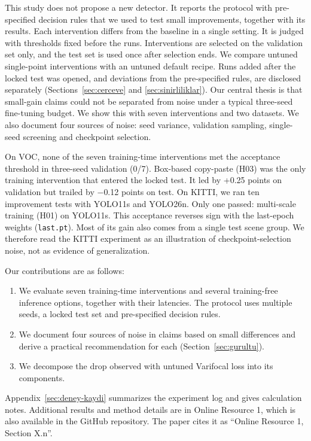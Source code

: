 \documentclass[pdflatex,iicol,sn-mathphys-num]{sn-jnl}
\begin{document}
This study does not propose a new detector. It reports the protocol with pre-specified decision rules that we used to test small improvements, together with its results. Each intervention differs from the baseline in a single setting. It is judged with thresholds fixed before the runs. Interventions are selected on the validation set only, and the test set is used once after selection ends. We compare untuned single-point interventions with an untuned default recipe. Runs added after the locked test was opened, and deviations from the pre-specified rules, are disclosed separately (Sections~\ref{sec:cerceve} and \ref{sec:sinirliliklar}). Our central thesis is that small-gain claims could not be separated from noise under a typical three-seed fine-tuning budget. We show this with seven interventions and two datasets. We also document four sources of noise: seed variance, validation sampling, single-seed screening and checkpoint selection.

On VOC, none of the seven training-time interventions met the acceptance threshold in three-seed validation (0/7). Box-based copy-paste (H03) was the only training intervention that entered the locked test. It led by +0.25 points on validation but trailed by $-$0.12 points on test. On KITTI, we ran ten improvement tests with YOLO11s and YOLO26n. Only one passed: multi-scale training (H01) on YOLO11s. This acceptance reverses sign with the last-epoch weights (\texttt{last.pt}). Most of its gain also comes from a single test scene group. We therefore read the KITTI experiment as an illustration of checkpoint-selection noise, not as evidence of generalization.

Our contributions are as follows:
\begin{enumerate}
\item We evaluate seven training-time interventions and several training-free inference options, together with their latencies. The protocol uses multiple seeds, a locked test set and pre-specified decision rules.
\item We document four sources of noise in claims based on small differences and derive a practical recommendation for each (Section~\ref{sec:gurultu}).
\item We decompose the drop observed with untuned Varifocal loss into its components.
\end{enumerate}

Appendix~\ref{sec:deney-kaydi} summarizes the experiment log and gives calculation notes. Additional results and method details are in Online Resource 1, which is also available in the GitHub repository. The paper cites it as ``Online Resource 1, Section X.n''.
\end{document}
